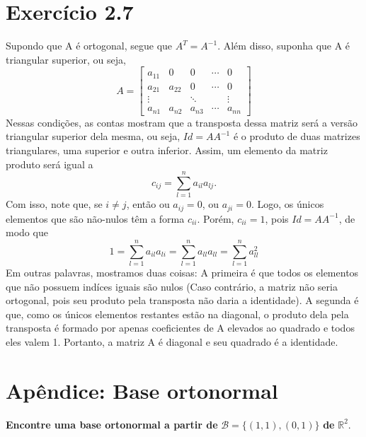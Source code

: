 \documentclass{article}
\begin{document}
\section*{Exerc\'icio 2.7}
Supondo que A \'e ortogonal, segue que $A ^{T} = A ^{-1}$. Al\'em disso, suponha que A \'e triangular superior, ou seja,
  $$
  A = \begin{bmatrix}
    a _{11} & 0 & 0 & \cdots & 0 \\
    a_{21} & a _{22} & 0 & \cdots & 0 \\
    \vdots & & \ddots & & \vdots\\
    a _{n1} & a _{n2} & a _{n3} & \cdots & a _{nn}
  \end{bmatrix}
  $$
Nessas condi\c c\~oes, as contas mostram que a transposta dessa matriz ser\'a a vers\~ao triangular superior dela mesma,
ou seja, $Id = AA^{-1}$ \'e o produto de duas matrizes triangulares, uma superior e outra inferior. Assim, um elemento
da matriz produto ser\'a igual a
  $$
    c_{ij} = \sum_{l=1}^{n} a _{il}a _{lj}.
  $$
  Com isso, note que, se $i\neq{j}$, ent\~ao ou $a_{ij} = 0$, ou $a _{ji} = 0$. Logo, os \'unicos elementos que 
  s\~ao n\~ao-nulos t\^em a forma $c _{ii}$. Por\'em, $c_{ii} = 1$, pois $Id = AA ^{-1}$, de modo que 
  $$
    1 = \sum_{l=1}^{n} a_{il}a_{li} = \sum_{l=1}^{n} a _{ll}a _{ll} = \sum _{l=1}^{n} a _{ll}^{2}
  $$
Em outras palavras, mostramos duas coisas: A primeira \'e que todos os elementos que n\~ao possuem ind\'ices iguais
s\~ao nulos (Caso contr\'ario, a matriz n\~ao seria ortogonal, pois seu produto pela transposta n\~ao daria a identidade).
A segunda \'e que, como os \'unicos elementos restantes est\~ao na diagonal, o produto dela pela transposta \'e formado
por apenas coeficientes de A elevados ao quadrado e todos eles valem 1. Portanto, a matriz A \'e diagonal e seu
quadrado \'e a identidade.

\section*{Ap\^endice: Base ortonormal}
\textbf{Encontre uma base ortonormal a partir de } $\mathcal{B} = \{(1, 1), (0, 1)\}$ \textbf{de} $\mathbb{R} ^{2}$.
\end{document}
